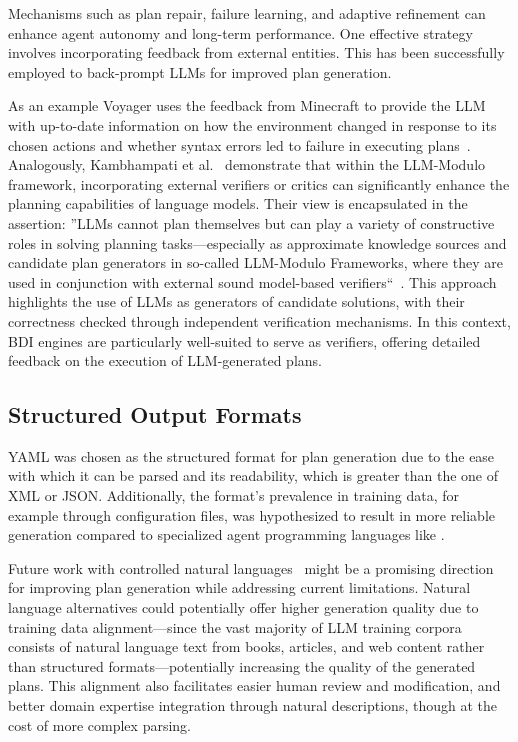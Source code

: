 \documentclass[12pt,a4paper,openright,twoside]{book}
\begin{document}
Mechanisms such as plan repair, failure learning, and adaptive refinement can enhance agent autonomy and long-term performance.
%
One effective strategy involves incorporating feedback from external entities.
%
This has been successfully employed to back-prompt \acp{LLM} for improved plan generation.

As an example Voyager uses the feedback from Minecraft to provide the \ac{LLM} with up-to-date information on how the environment changed in response to its chosen actions and whether syntax errors led to failure in executing plans~\cite{WangX0MXZFA24}.
%
Analogously, Kambhampati et al.~\cite{kambhampatiLLMsCantPlan2024} demonstrate that within the LLM-Modulo framework, incorporating external verifiers or critics can significantly enhance the planning capabilities of language models.
%
Their view is encapsulated in the assertion: ''\acp{LLM} cannot plan themselves but can play a variety of constructive roles in solving planning tasks---especially as approximate knowledge sources and candidate plan generators in so-called LLM-Modulo Frameworks, where they are used in conjunction with external sound model-based verifiers``~\cite{kambhampatiLLMsCantPlan2024}.
%
This approach highlights the use of \acp{LLM} as generators of candidate solutions, with their correctness checked through independent verification mechanisms.
%
In this context, BDI engines are particularly well-suited to serve as verifiers, offering detailed feedback on the execution of \ac{LLM}-generated plans.

\subsection{Structured Output Formats}\label{sec:llm-gen-formats}

YAML was chosen as the structured format for plan generation due to the ease with which it can be parsed and its readability, which is greater than the one of XML or JSON.
%
Additionally, the format's prevalence in training data, for example through configuration files, was hypothesized to result in more reliable generation compared to specialized agent programming languages like \agentspeak{}. 

Future work with controlled natural languages~\cite{kuhnSurveyClassificationControlled2014} might be a promising direction for improving plan generation while addressing current limitations. 
%
Natural language alternatives could potentially offer higher generation quality due to training data alignment---since the vast majority of LLM training corpora consists of natural language text from books, articles, and web content rather than structured formats---potentially increasing the quality of the generated plans.
%
This alignment also facilitates easier human review and modification, and better domain expertise integration through natural descriptions, though at the cost of more complex parsing. 
\end{document}
